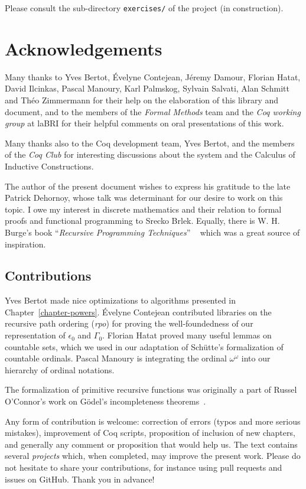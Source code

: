 \documentclass[a4paper]{book}
\begin{document}
Please consult the sub-directory \texttt{exercises/} of the
 project (in construction).

\section{Acknowledgements}
\label{sec:orgheadline5}
    Many thanks to Yves Bertot, \'Evelyne Contejean, Jéremy Damour,   Florian Hatat,  David Ilcinkas, 
Pascal Manoury,  Karl Palmskog, Sylvain Salvati, Alan Schmitt and Théo Zimmermann for their help on the elaboration of this library and  document, and to the
 members of the \emph{Formal Methods} team and the \emph{Coq working group} at laBRI for their helpful comments 
on  oral presentations of this work. 

Many thanks also to the Coq development team, Yves Bertot, and the members of the \emph{Coq Club} for interesting discussions about the \coq{} system and the Calculus of Inductive Constructions.

The author of the present document wishes to express his gratitude to the late Patrick Dehornoy, whose talk  was determinant for our desire to work on this topic.
I owe my interest in discrete mathematics and their relation to formal proofs and functional programming  to Srecko Brlek.  Equally, there is W. H. Burge's book ``\emph{Recursive Programming Techniques}'' ~\cite{burge} which was a great  source of inspiration.



\subsection{Contributions}

Yves Bertot made nice optimizations  to algorithms presented in Chapter~\ref{chapter-powers}.
\'Evelyne Contejean contributed libraries on the recursive path ordering (\emph{rpo}) for proving the well-foundedness of our representation of $\epsilon_0$ and $\Gamma_0$.
Florian Hatat proved many useful lemmas on countable sets, which we used in our adaptation of Schütte's formalization of countable ordinals. Pascal Manoury is integrating the ordinal $\omega^\omega$ into our hierarchy of ordinal notations.

The formalization of primitive recursive functions was originally a part of  Russel O'Connor's work on G\"odel's incompleteness theorems~\cite{OConnor05}. 

\label{sec:orgheadline2}

Any form of contribution  is welcome: correction of errors (typos and more serious mistakes), improvement of
Coq scripts, proposition of inclusion of new chapters, and generally any
comment or proposition that would help us. The text contains several \emph{projects} which, when completed, may improve the present work.
Please do not hesitate to share your contributions, for instance using pull requests and issues on GitHub. Thank you in advance!
\end{document}

